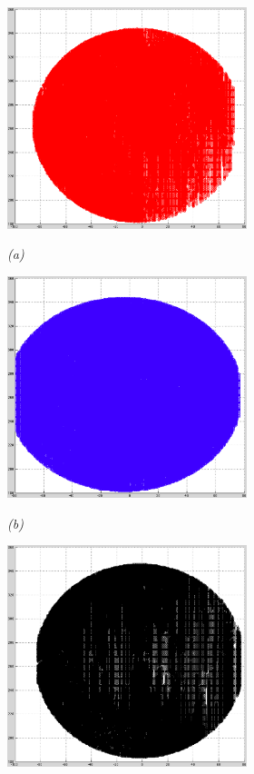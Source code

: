 \begin{figure}[htb]
  \begin{minipage}[b]{2.75in}
    \centering
    \centerline{\mbox{\includegraphics[width=2.75in]{data_extraction/images/surface_plane/superior_inside/xy.eps}}}
    \centerline{\emph{(a)}}
  \end{minipage}\medskip
  \begin{minipage}[b]{2.75in}
    \centering
    \centerline{\mbox{\includegraphics[width=2.75in]{data_extraction/images/surface_plane/superior_outside/xy.eps}}}
    \centerline{\emph{(b)}}
  \end{minipage}
  \begin{minipage}[b]{2.75in}
    \centering
    \centerline{\mbox{\includegraphics[width=2.75in]{data_extraction/images/surface_plane/inferior_inside/xy.eps}}}

\end{minipage}
\end{figure}

